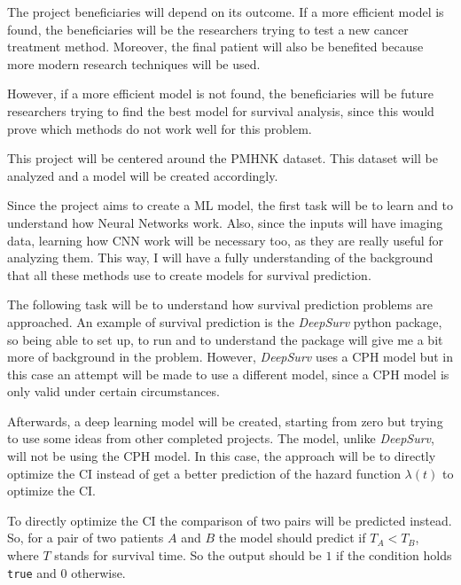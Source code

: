The project beneficiaries will depend on its outcome. If a more efficient model is found, the
beneficiaries will be the researchers trying to test a new cancer treatment method. Moreover,
the final patient will also be benefited because more modern research techniques will be used.

However, if a more efficient model is not found, the beneficiaries will be future researchers
trying to find the best model for survival analysis, since this would prove which 
methods do not work well for this problem.


This project will be centered around the \gls{PMHNK} dataset. This dataset will be analyzed
and a model will be created accordingly.

Since the project aims to create a \gls{ML} model, the first task will be to learn and 
to understand how Neural Networks work. Also, since the inputs will have imaging data, learning
how \gls{CNN} work will be necessary too, as they are really useful for analyzing them. 
This way, I will have a fully understanding of the 
background that all these methods use to create models for survival prediction.

The following task will be to understand how survival prediction problems are approached. An
example of survival prediction is the \emph{DeepSurv} python package, so being able to set 
up, to run and to understand the package will give me a bit more of background in the problem.
However, \emph{DeepSurv} uses a \gls{CPH} model but in this case an attempt will be made to use
a different model, since a \gls{CPH} model is only valid under certain circumstances.
~\cites{medical:deep-surv-github}{medical:cox}

Afterwards, a deep learning model will be created, starting from zero but trying to use some
ideas from other completed projects. The model, unlike \emph{DeepSurv}, will not be using
the \gls{CPH} model. In this case, the approach will be to directly optimize the \gls{CI}
instead of get a better prediction of the hazard function \( \lambda(t) \) to optimize 
the \gls{CI}.

To directly optimize the \gls{CI} the comparison of two pairs will be predicted instead. So,
for a pair of two patients \( A \) and \( B \) the model should predict if \( T_A < T_B \),
where \( T \) stands for survival time. So the output should be \( 1 \) if the condition holds
\texttt{true} and \( 0 \) otherwise.

